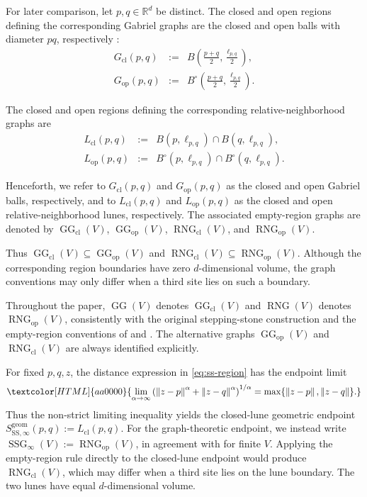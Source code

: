 \documentclass[a4paper,fleqn]{cas-dc}
\theoremstyle{definition}
\theoremstyle{remark}
\newcommand{\R}{\mathds{R}}
\newcommand{\norm}[1]{\left\lVert #1\right\rVert}
\newcommand{\ellpq}{\ell_{p,q}}
\newcommand{\0}{\mathbf{0}}
\newcommand{\tr}[1]{\textcolor[HTML]{aa0000}{#1}}
\DeclareMathOperator{\SSG}{SSG}
\DeclareMathOperator{\RNG}{RNG}
\DeclareMathOperator{\GG}{GG}
\begin{document}
For later comparison, let $p,q\in\R^d$ be distinct. The closed and open
regions defining the corresponding Gabriel graphs are the closed and open
balls with diameter $pq$, respectively
\citep{gabriel1969statistical,matula1980properties}:
\begin{eqnarray}
G_{\mathrm{cl}}(p,q)
&:=&
B\!\left(\frac{p+q}{2},\frac{\ellpq}{2}\right),\\
G_{\mathrm{op}}(p,q)
&:=&
B^\circ\!\left(\frac{p+q}{2},\frac{\ellpq}{2}\right).
\end{eqnarray}

The closed and open regions defining the corresponding
relative-neighborhood graphs are
\citep{toussaint1980relative,jaromczyk1992relative}
\begin{eqnarray}
L_{\mathrm{cl}}(p,q)
&:=&
B(p,\ellpq)\cap B(q,\ellpq),\\
L_{\mathrm{op}}(p,q)
&:=&
B^\circ(p,\ellpq)\cap B^\circ(q,\ellpq).
\end{eqnarray}

Henceforth, we refer to $G_{\mathrm{cl}}(p,q)$ and
$G_{\mathrm{op}}(p,q)$ as the closed and open Gabriel balls, respectively,
and to $L_{\mathrm{cl}}(p,q)$ and $L_{\mathrm{op}}(p,q)$ as the closed and
open relative-neighborhood lunes, respectively. 
The associated
empty-region graphs are denoted by
$\GG_{\mathrm{cl}}(V)$, $\GG_{\mathrm{op}}(V)$,
$\RNG_{\mathrm{cl}}(V)$, and $\RNG_{\mathrm{op}}(V)$.








Thus $\GG_{\mathrm{cl}}(V)\subseteq\GG_{\mathrm{op}}(V)$ and
$\RNG_{\mathrm{cl}}(V)\subseteq\RNG_{\mathrm{op}}(V)$. Although the
corresponding region boundaries have zero $d$-dimensional volume, the graph
conventions may only differ when a third site lies on such a boundary.

Throughout the paper, $\GG(V)$ denotes $\GG_{\mathrm{cl}}(V)$ and
$\RNG(V)$ denotes $\RNG_{\mathrm{op}}(V)$, consistently with the original
stepping-stone construction and the empty-region conventions of
\citet{kannangara2018stepping} and \citet{cardinal2009empty}. The alternative graphs
$\GG_{\mathrm{op}}(V)$ and $\RNG_{\mathrm{cl}}(V)$ are always identified
explicitly.


\tr{For fixed $p,q,z$, the distance expression in
\eqref{eq:ss-region} has the endpoint limit}
\begin{equation*}
\tr{\lim_{\alpha\to\infty}
  \left(\norm{z-p}^{\alpha}+\norm{z-q}^{\alpha}\right)^{1/\alpha}
  =\max\{\norm{z-p},\norm{z-q}\}.}
\end{equation*}
\tr{Thus the non-strict limiting inequality yields the closed-lune
geometric endpoint
$S_{\mathrm{SS},\infty}^{\mathrm{geom}}(p,q):=L_{\mathrm{cl}}(p,q)$.
For the graph-theoretic endpoint, we instead write
$\SSG_\infty(V):=\RNG_{\mathrm{op}}(V)$, in agreement with
\Cref{cor:finite-stabilization} for finite $V$.
Applying the empty-region rule directly to the closed-lune endpoint
would produce $\RNG_{\mathrm{cl}}(V)$, which may differ when a
third site lies on the lune boundary. The two lunes have equal
$d$-dimensional volume.}
\end{document}
